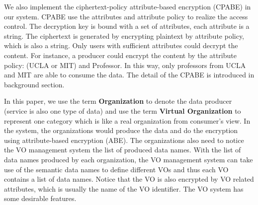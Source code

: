 We also implement the ciphertext-policy attribute-based encryption (CPABE) in our system.
CPABE use the attributes and attribute policy to realize the access control.
The decryption key is bound with a set of attributes, each attribute is a string.
The ciphertext is generated by encrypting plaintext by attribute policy, which is also a string.
Only users with sufficient attributes could decrypt the content.
For instance, a producer could encrypt the content by the attribute policy: (UCLA or MIT) and Professor.
In this way, only professors from UCLA and MIT are able to consume the data.
The detail of the CPABE is introduced in background section.

In this paper, we use the term \textbf{Organization} to denote the data producer (service is also one type of data) and use the term \textbf{Virtual Organization} to represent one category which is like a real organization from consumer's view.
In the system, the organizations would produce the data and do the encryption using attribute-based encryption (ABE).
The organizations also need to notice the VO management system the list of produced data names.
With the list of data names produced by each organization, the VO management system can take use of the semantic data names to define different VOs and thus each VO contains a list of data names.
Notice that the VO is also encrypted by VO related attributes, which is usually the name of the VO identifier.
The VO system has some desirable features.
